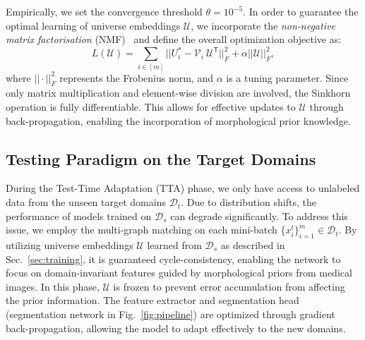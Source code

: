 Empirically, we set the convergence threshold $\theta=10^{-5}$. In order to guarantee the optimal learning of universe embeddings $\mathcal{U}$, we incorporate the \textit{non-negative matrix factorisation} (NMF)~\cite{lee1999learning,bernard2019synchronisation} and define the overall optimization objective as: 
\vspace{-5pt}
\begin{equation}
    L(\mathcal{U}) = \sum_{i\in [m]} || {U}^\ast_i - \mathcal{V}_i \ \mathcal{U}^{\mathsf{T}} ||^2_F + \alpha ||\mathcal{U} ||_F^2,
\end{equation}
where $||\cdot||^2_F$ represents the Frobenius norm, and $\alpha$ is a tuning parameter. Since only matrix multiplication and element-wise division are involved, the Sinkhorn operation is fully differentiable. This allows for effective updates to $\mathcal{U}$ through back-propagation, enabling the incorporation of morphological prior knowledge.

\subsection{Testing Paradigm on the Target Domains}
\label{sec:testing}
During the Test-Time Adaptation (TTA) phase, we only have access to unlabeled data from the unseen target domains $\mathcal{D}_t$. Due to distribution shifts, the performance of models trained on $\mathcal{D}_s$ can degrade significantly. To address this issue, we employ the multi-graph matching on each mini-batch $\{x_i^t\}_{i=1}^{m} \in \mathcal{D}_t$. By utilizing universe embeddings $\mathcal{U}$ learned from $\mathcal{D}_s$ as described in Sec.~\ref{sec:training}, it is guaranteed cycle-consistency, enabling the network to focus on domain-invariant features guided by morphological priors from medical images. 
In this phase, $\mathcal{U}$ is frozen to prevent error accumulation from affecting the prior information. The feature extractor and segmentation head (segmentation network in Fig.~\ref{fig:pipeline}) are optimized through gradient back-propagation, allowing the model to adapt effectively to the new domains.

